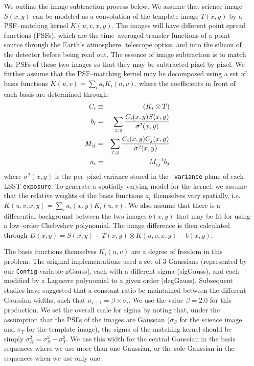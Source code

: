 \documentclass[prd, nofootinbib, floatfix, 11pt,tightenlines,times]{article}
\begin{document}
We outline the image subtraction process below.  We assume that science
image $S(x,y)$ can be modeled as a convolution of the template image
$T(x,y)$ by a PSF--matching kernel $K(u,v,x,y)$.  The images will have
different point spread functions (PSFs), which are the time--averaged
transfer functions of a point source through the Earth's atmosphere,
telescope optics, and into the silicon of the detector before being
read out.  The essence of image subtraction is to match the PSFs of
these two images so that they may be subtracted pixel by pixel.  We
further assume that the PSF--matching kernel may be decomposed using a
set of basis functions $K(u,v) = \sum_i a_i K_i(u,v)$, where the
coefficients in front of each basis are determined through:
%
\begin{eqnarray}
C_i & \equiv & (K_i \otimes T) \\ \nonumber
b_{i}  & = & \sum_{x,y} {{C_i(x,y) S(x,y)}\over{\sigma^2(x,y)}}   \nonumber \\ 
M_{ij} & = & \sum_{x,y} {{C_i(x,y) C_j(x,y)}\over{\sigma^2(x,y)}}  \nonumber \\ 
a_{i}  & = & M^{-1}_{ij} b_{j} \nonumber 
\label{eq-soln}
\end{eqnarray}
where $\sigma^2(x,y)$ is the per--pixel variance stored in the {\tt
  variance} plane of each LSST {\tt exposure}.  To generate a
spatially varying model for the kernel, we assume that the relative
weights of the basis functions $a_i$ themselves vary spatially,
i.e. $K(u,v,x,y) = \sum_i a_i(x,y) K_i(u,v)$.  We also assume that
there is a differential background between the two images $b(x,y)$
that may be fit for using a low--order Chebyshev polynomial.  The
image difference is then calculated through $D(x,y) = S(x,y) - T(x,y)
\otimes K(u,v,x,y) - b(x,y)$.

The basis functions themselves $K_i(u,v)$ are a degree of freedom in
this problem.  The original implementations \citep{Alard98,Alard00}
used a set of 3 Gaussians (represented by our {\tt Config} variable
nGauss), each with a different sigma (sigGauss), and each modified by
a Laguerre polynomial to a given order (degGauss).  Subsequent studies
\citep[e.g.][]{2007AN....328...16I} have suggested that a constant
ratio be maintained between the different Gaussian widths, such that
$\sigma_{i+1} = \beta \times \sigma_{i}$.  We use the value $\beta =
2.0$ for this production.  We set the overall scale for sigma by
noting that, under the assumption that the PSFs of the images are
Gaussian ($\sigma_S$ for the science image and $\sigma_T$ for the
template image), the sigma of the matching kernel should be simply
$\sigma_K^2 = \sigma_S^2 - \sigma_T^2$.  We use this width for the
central Gaussian in the basis sequences where we use more than one
Gaussian, or the sole Gaussian in the sequences when we use only one.
\end{document}
